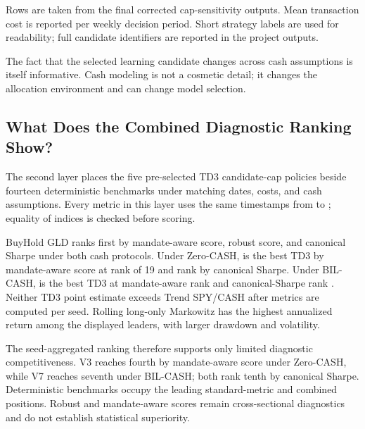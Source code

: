 \documentclass[11pt]{article}
\newcommand{\cashzero}{Zero-CASH}
\newcommand{\cashbil}{BIL-CASH}
\begin{document}
Rows are taken from the final corrected cap-sensitivity outputs. Mean transaction cost is reported per weekly decision period. Short strategy labels are used for readability; full candidate identifiers are reported in the project outputs.

The fact that the selected learning candidate changes across cash assumptions is itself informative. Cash modeling is not a cosmetic detail; it changes the allocation environment and can change model selection.

\subsection{What Does the Combined Diagnostic Ranking Show?}

The second layer places the five pre-selected TD3 candidate-cap policies beside fourteen deterministic benchmarks under matching dates, costs, and cash assumptions. Every metric in this layer uses the same \AlignedWeeks{} timestamps from \AlignedStartDate{} to \AlignedEndDate{}; equality of indices is checked before scoring.

BuyHold GLD ranks first by mandate-aware score, robust score, and canonical Sharpe under both cash protocols. Under \cashzero{}, \ZeroBestTDThreeLabel{} is the best TD3 by mandate-aware score at rank \ZeroBestTDThreeMandateRank{} of 19 and rank \ZeroBestTDThreeSharpeRank{} by canonical Sharpe. Under \cashbil{}, \BilBestTDThreeLabel{} is the best TD3 at mandate-aware rank \BilBestTDThreeMandateRank{} and canonical-Sharpe rank \BilBestTDThreeSharpeRank{}. Neither TD3 point estimate exceeds Trend SPY/CASH after metrics are computed per seed. Rolling long-only Markowitz has the highest annualized return among the displayed leaders, with larger drawdown and volatility.

The seed-aggregated ranking therefore supports only limited diagnostic competitiveness. V3 reaches fourth by mandate-aware score under \cashzero{}, while V7 reaches seventh under \cashbil{}; both rank tenth by canonical Sharpe. Deterministic benchmarks occupy the leading standard-metric and combined positions. Robust and mandate-aware scores remain cross-sectional diagnostics and do not establish statistical superiority.
\end{document}

